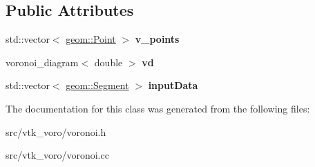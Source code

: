 \subsection*{Public Attributes}
\begin{DoxyCompactItemize}
\item 
std\+::vector$<$ \hyperlink{classgeom_1_1Point}{geom\+::\+Point} $>$ {\bfseries v\+\_\+points}\hypertarget{classvor_1_1Voro_a1e7c16405ed3d7df07b3d6215fd5bdb2}{}\label{classvor_1_1Voro_a1e7c16405ed3d7df07b3d6215fd5bdb2}

\item 
voronoi\+\_\+diagram$<$ double $>$ {\bfseries vd}\hypertarget{classvor_1_1Voro_a20f61d3b89d1ccee62fd3ef28783afcf}{}\label{classvor_1_1Voro_a20f61d3b89d1ccee62fd3ef28783afcf}

\item 
std\+::vector$<$ \hyperlink{classgeom_1_1Segment}{geom\+::\+Segment} $>$ {\bfseries input\+Data}\hypertarget{classvor_1_1Voro_a40a05cf3ed53820546d0a64c55d58a1a}{}\label{classvor_1_1Voro_a40a05cf3ed53820546d0a64c55d58a1a}

\end{DoxyCompactItemize}


The documentation for this class was generated from the following files\+:\begin{DoxyCompactItemize}
\item 
src/vtk\+\_\+voro/voronoi.\+h\item 
src/vtk\+\_\+voro/voronoi.\+cc\end{DoxyCompactItemize}
